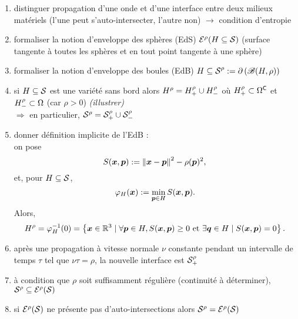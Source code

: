 \par\bigskip
\begin{enumerate}
	\item distinguer propagation d'une onde et d'une interface entre deux milieux matériels (l'une peut s'auto-intersecter, l'autre non) $\to$ condition d'entropie
	\item formaliser la notion d'enveloppe des sphères (EdS) ${\mathcal{E}}^{\rho}({H \subseteq \mathcal{S}})$ (surface tangente à toutes les sphères et en tout point tangente à une sphère)
	\item formaliser la notion d'enveloppe des boules (EdB) ${H \subseteq \mathcal{S}}^{\rho} := \partial  \left( \mathscr{B}(H,\rho) \right)$
	\item si $H \subseteq \mathcal{S}$ est une variété sans bord alors ${H}^{\rho}  = {H}_{+}^{\rho} \cup {H}_{-}^{\rho}$ où ${H}_{+}^{\rho} \subset \Omega^\mathsf{C}$ et ${H}_{-}^{\rho} \subset \Omega$ (car $\rho > 0$) \textit{(illustrer)}\\
	$\Rightarrow$ en particulier, ${\mathcal{S}}^{\rho}  = {\mathcal{S}}_{+}^{\rho} \cup {\ensuremath{\mathcal{S}}}_{-}^{\rho}$
	
	
	\item donner définition implicite de l'EdB :\\
	on pose 
	\[
		S(\bm{x}, \bm{p}) := \left\| {\bm{x} - \bm{p}} \right\|^2 - \rho(\bm{p})^2,
	\]
	et, pour $H \subseteq \mathcal{S}$, 
	\[
		\varphi_{H}(\bm{x}) := \min_{\bm{p} \in H} S(\bm{x}, \bm{p}).
	\]
	Alors,
	\[ 
		{H}^{\rho} 
		= \varphi_{H}^{-1}(0)
		= 
		\left\{
			\bm{x} \in \mathbb{R}^3 \mid \forall \bm{p} \in H, S(\bm{x}, \bm{p}) \geq 0
			\text{ et } \exists \bm{q} \in H \mid S(\bm{x}, \bm{p}) = 0
		\right\}.
	\]
	\item après une propagation à vitesse normale $\nu$ constante pendant un intervalle de temps $\tau$ tel que $\nu \tau = \rho$, la nouvelle interface est ${\mathcal{S}}_{+}^{\rho}$
	\item à condition que $\rho$ soit suffisamment régulière (continuité à déterminer), ${\mathcal{S}}^{\rho} \subseteq {\mathcal{E}}^{\rho}({\mathcal{S}})$
	\item si ${\mathcal{E}}^{\rho}({\mathcal{S}})$ ne présente pas d'auto-intersections alors ${\mathcal{S}}^{\rho} = {\mathcal{E}}^{\rho}({\mathcal{S}})$
\end{enumerate}


